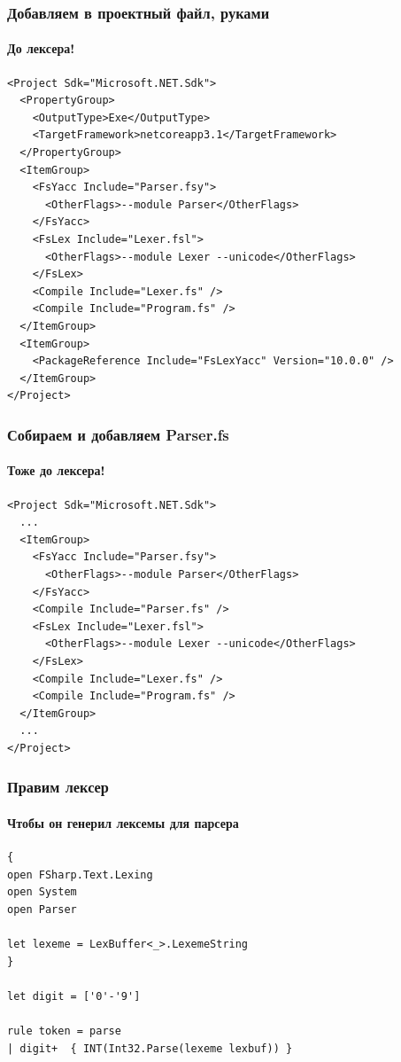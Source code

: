 \documentclass{../../slides-style}
\begin{document}
    \begin{frame}[fragile]
        \frametitle{Добавляем в проектный файл, руками}
        \framesubtitle{До лексера!}
        \begin{scriptsize}
            \begin{verbatim}
<Project Sdk="Microsoft.NET.Sdk">
  <PropertyGroup>
    <OutputType>Exe</OutputType>
    <TargetFramework>netcoreapp3.1</TargetFramework>
  </PropertyGroup>
  <ItemGroup>
    <FsYacc Include="Parser.fsy">
      <OtherFlags>--module Parser</OtherFlags>
    </FsYacc>
    <FsLex Include="Lexer.fsl">
      <OtherFlags>--module Lexer --unicode</OtherFlags>
    </FsLex>
    <Compile Include="Lexer.fs" />
    <Compile Include="Program.fs" />
  </ItemGroup>
  <ItemGroup>
    <PackageReference Include="FsLexYacc" Version="10.0.0" />
  </ItemGroup>
</Project>
            \end{verbatim}
        \end{scriptsize}
    \end{frame}

    \begin{frame}[fragile]
        \frametitle{Собираем и добавляем Parser.fs}
        \framesubtitle{Тоже до лексера!}
        \begin{scriptsize}
            \begin{verbatim}
<Project Sdk="Microsoft.NET.Sdk">
  ...
  <ItemGroup>
    <FsYacc Include="Parser.fsy">
      <OtherFlags>--module Parser</OtherFlags>
    </FsYacc>
    <Compile Include="Parser.fs" />
    <FsLex Include="Lexer.fsl">
      <OtherFlags>--module Lexer --unicode</OtherFlags>
    </FsLex>
    <Compile Include="Lexer.fs" />
    <Compile Include="Program.fs" />
  </ItemGroup>
  ...
</Project>
            \end{verbatim}
        \end{scriptsize}
    \end{frame}

    \begin{frame}[fragile]
        \frametitle{Правим лексер}
        \framesubtitle{Чтобы он генерил лексемы для парсера}
        \begin{small}
            \begin{verbatim}
{ 
open FSharp.Text.Lexing
open System
open Parser

let lexeme = LexBuffer<_>.LexemeString
}

let digit = ['0'-'9']

rule token = parse
| digit+  { INT(Int32.Parse(lexeme lexbuf)) }
            \end{verbatim}
        \end{small}
    \end{frame}
\end{document}
